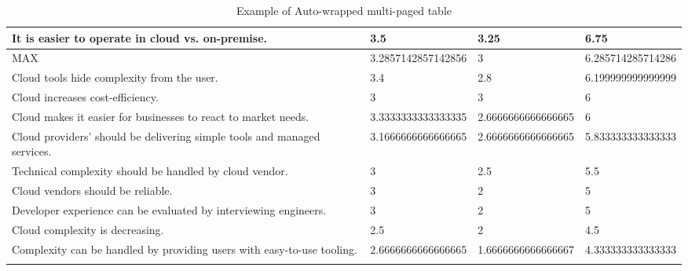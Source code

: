 \begin{longtable}{|p{10cm}|p{2cm}|p{2cm}|}
It is easier to operate in cloud vs. on-premise. & 3.5 & 3.25 & 6.75 \\ \hline
MAX & 3.2857142857142856 & 3 & 6.285714285714286 \\ \hline
Cloud tools hide complexity from the user. & 3.4 & 2.8 & 6.199999999999999 \\ \hline
Cloud increases cost-efficiency. & 3 & 3 & 6 \\ \hline
Cloud makes it easier for businesses to react to market needs. & 3.3333333333333335 & 2.6666666666666665 & 6 \\ \hline
Cloud providers' should be delivering simple tools and managed services. & 3.1666666666666665 & 2.6666666666666665 & 5.833333333333333 \\ \hline
Technical complexity should be handled by cloud vendor. & 3 & 2.5 & 5.5 \\ \hline
Cloud vendors should be reliable. & 3 & 2 & 5 \\ \hline
Developer experience can be evaluated by interviewing engineers. & 3 & 2 & 5 \\ \hline
Cloud complexity is decreasing. & 2.5 & 2 & 4.5 \\ \hline
Complexity can be handled by providing users with easy-to-use tooling. & 2.6666666666666665 & 1.6666666666666667 & 4.333333333333333 \\ \hline
\caption{Example of Auto-wrapped multi-paged table}
\label{tab:table1}
\end{longtable}
